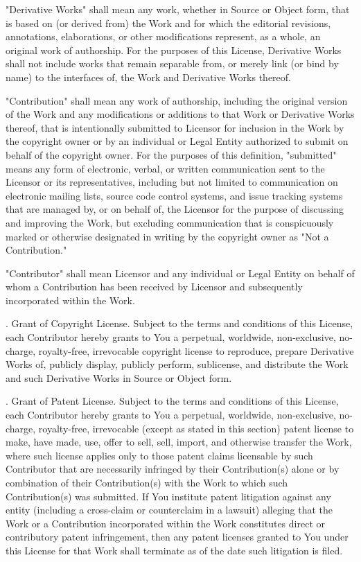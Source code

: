 \noindent "Derivative Works" shall mean any work, whether in Source or Object form, that is based on (or derived from) the Work and for which the editorial revisions, annotations, elaborations, or other modifications represent, as a whole, an original work of authorship. For the purposes of this License, Derivative Works shall not include works that remain separable from, or merely link (or bind by name) to the interfaces of, the Work and Derivative Works thereof.

\noindent "Contribution" shall mean any work of authorship, including the original version of the Work and any modifications or additions to that Work or Derivative Works thereof, that is intentionally submitted to Licensor for inclusion in the Work by the copyright owner or by an individual or Legal Entity authorized to submit on behalf of the copyright owner. For the purposes of this definition, "submitted" means any form of electronic, verbal, or written communication sent to the Licensor or its representatives, including but not limited to communication on electronic mailing lists, source code control systems, and issue tracking systems that are managed by, or on behalf of, the Licensor for the purpose of discussing and improving the Work, but excluding communication that is conspicuously marked or otherwise designated in writing by the copyright owner as "Not a Contribution."

\noindent "Contributor" shall mean Licensor and any individual or Legal Entity on behalf of whom a Contribution has been received by Licensor and subsequently incorporated within the Work.

\bigskip
{}. Grant of Copyright License. Subject to the terms and conditions of this License, each Contributor hereby grants to You a perpetual, worldwide, non-exclusive, no-charge, royalty-free, irrevocable copyright license to reproduce, prepare Derivative Works of, publicly display, publicly perform, sublicense, and distribute the Work and such Derivative Works in Source or Object form.

\bigskip
{}. Grant of Patent License. Subject to the terms and conditions of this License, each Contributor hereby grants to You a perpetual, worldwide, non-exclusive, no-charge, royalty-free, irrevocable (except as stated in this section) patent license to make, have made, use, offer to sell, sell, import, and otherwise transfer the Work, where such license applies only to those patent claims licensable by such Contributor that are necessarily infringed by their Contribution(s) alone or by combination of their Contribution(s) with the Work to which such Contribution(s) was submitted. If You institute patent litigation against any entity (including a cross-claim or counterclaim in a lawsuit) alleging that the Work or a Contribution incorporated within the Work constitutes direct or contributory patent infringement, then any patent licenses granted to You under this License for that Work shall terminate as of the date such litigation is filed.

